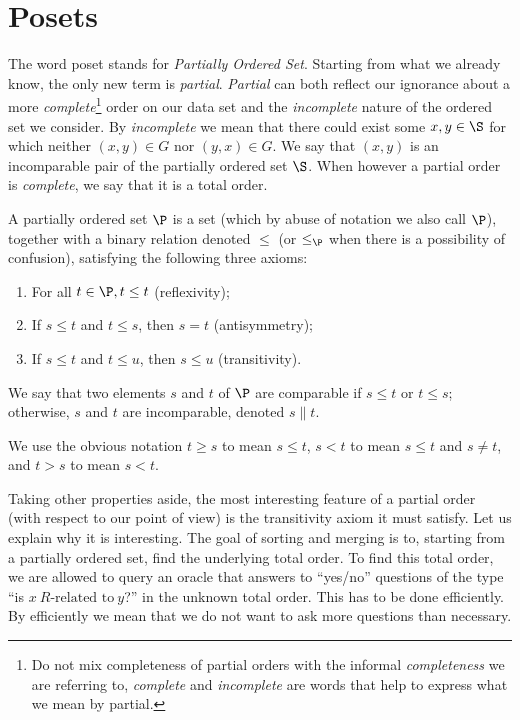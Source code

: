 \section{Posets}

The word poset stands for \emph{Partially Ordered Set}. Starting from
what we already know, the only new term is \emph{partial}. \emph{Partial} can
both reflect our ignorance about a more
\emph{complete}\footnote{Do not mix completeness of partial orders with the informal
\emph{completeness} we are referring to, \emph{complete} and \emph{incomplete}
are words that help to express what we mean by partial.}
order on our data set
and the \emph{incomplete} nature of the ordered set we consider. By
\emph{incomplete} we mean that there could exist some $x, y \in \S$ for which
neither $(x, y) \in G$ nor $(y, x) \in G$. We say that $(x,y)$ is an
incomparable pair of the partially ordered set \(\S\). When however a partial
order is \emph{complete}, we say that it is a total order.
\begin{definition}
A partially ordered set $\P$ is a set (which by abuse of notation we also call
$\P$), together with a binary relation denoted $\leq$ (or $\leq_{\P}$ when there is
a possibility of confusion), satisfying the following three axioms:
\begin{enumerate}
\item For all $t \in \P, t \leq t$ (reflexivity);
\item If $s \leq t$ and $t \leq s$, then $s = t$ (antisymmetry);
\item If $s \leq t$ and $t \leq u$, then $s \leq u$ (transitivity).
\end{enumerate}

We say that two elements $s$ and $t$ of $\P$ are comparable if $s \leq t$ or $t
\leq s$; otherwise, $s$ and $t$ are incomparable, denoted $s \parallel t$.

We use the obvious notation $t \geq s$ to mean $s \leq t$, $s < t$ to mean $s
\leq t$ and $s \neq t$, and $t > s$ to mean $s < t$.
\end{definition}

Taking other properties aside, the most interesting feature of a partial order
(with respect to our point of view) is the transitivity axiom it must satisfy.
Let us explain why it is interesting. The goal of sorting and merging is to,
starting from a partially ordered set, find the underlying total order. To find
this total order, we are allowed to query an oracle that answers to ``yes/no''
questions of the type ``is $x~R\text{-related to}~y$?'' in the unknown total
order. This has to be done efficiently. By efficiently we mean that we do not
want to ask more questions than necessary.

